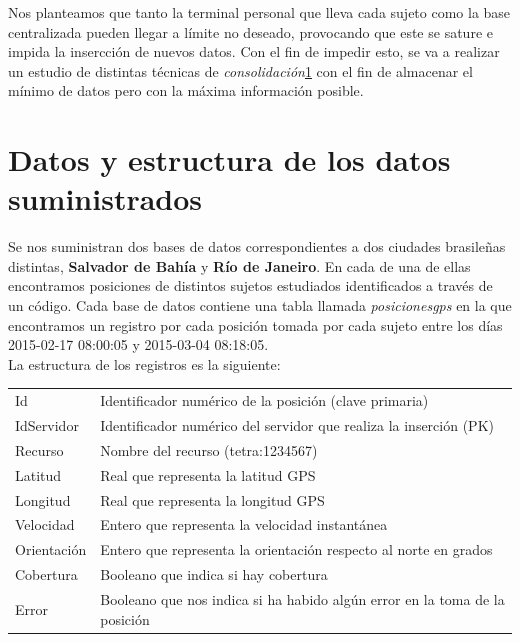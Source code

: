 \documentclass[a4paper, 12pt]{article}
\begin{document}
Nos planteamos que tanto la terminal personal que lleva cada sujeto como la base centralizada pueden llegar a l\'imite no deseado, provocando que este se sature e impida la insercci\'on de nuevos datos. Con el fin de impedir esto, se va a realizar un estudio de distintas t\'ecnicas de \textit{consolidaci\'on}\ref{} con el fin de almacenar el m\'inimo de datos pero con la m\'axima informaci\'on posible.  \\

\pagebreak

\section{Datos y estructura de los datos suministrados}

Se nos suministran dos bases de datos correspondientes a dos ciudades brasile\~nas distintas, \textbf{Salvador de Bah\'ia} y \textbf{R\'io de Janeiro}. En cada de una de ellas encontramos posiciones de distintos sujetos estudiados identificados a trav\'es de un c\'odigo. Cada base de datos contiene una tabla llamada \textit{posicionesgps} en la que encontramos un registro por cada posici\'on tomada por cada sujeto entre los d\'ias 2015-02-17 08:00:05 y 2015-03-04 08:18:05. \\

La estructura de los registros es la siguiente:\\

\begin{center}
	\begin{tabular}{| l | l  |}
	\hline
	\rowcolor{LightCyan}
	\hline
  		\multicolumn{2}{|l|}{Par\'ametros} \\
	\hline
	Id & Identificador num\'erico de la posici\'on (clave primaria) \\
	IdServidor & Identificador num\'erico del servidor que realiza la inserci\'on (PK) \\
	Recurso & Nombre del recurso (tetra:1234567) \\
	Latitud & Real que representa la latitud GPS \\
	Longitud & Real que representa la longitud GPS \\
		Velocidad & Entero que representa la velocidad instant\'anea \\
	Orientaci\'on & Entero que representa la orientaci\'on respecto al norte en grados \\
	Cobertura & Booleano que indica si hay cobertura \\
	Error & Booleano que nos indica si ha habido alg\'un error en la toma de la posici\'on \\
	\hline
	\end{tabular}

\end{center}
\end{document}
